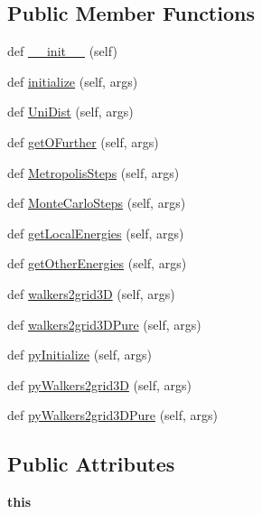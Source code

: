 \subsection*{Public Member Functions}
\begin{DoxyCompactItemize}
\item 
def \hyperlink{classMontePython__cxx_1_1Warray_a07657a81a5e76b16a8fd1be4acd4c866}{\+\_\+\+\_\+init\+\_\+\+\_\+} (self)
\item 
def \hyperlink{classMontePython__cxx_1_1Warray_a6f5d808b54b22a069fc2d5de2621a944}{initialize} (self, args)
\item 
def \hyperlink{classMontePython__cxx_1_1Warray_ab5f086c7899dfdffcfee1c7191f47302}{Uni\+Dist} (self, args)
\item 
def \hyperlink{classMontePython__cxx_1_1Warray_a70db0115b835ad74080bdd64533b9e57}{get\+O\+Further} (self, args)
\item 
def \hyperlink{classMontePython__cxx_1_1Warray_a86e6b38df98cccc4268b27c9accc7f2c}{Metropolis\+Steps} (self, args)
\item 
def \hyperlink{classMontePython__cxx_1_1Warray_acfbf002621317b560957b878bc165115}{Monte\+Carlo\+Steps} (self, args)
\item 
def \hyperlink{classMontePython__cxx_1_1Warray_a03bda23743edbe907b6bf102e75a493d}{get\+Local\+Energies} (self, args)
\item 
def \hyperlink{classMontePython__cxx_1_1Warray_acfd3f3a7af174289bd0523083b9d0afd}{get\+Other\+Energies} (self, args)
\item 
def \hyperlink{classMontePython__cxx_1_1Warray_a80ffdaa1a051f2987c18fec35d3691a7}{walkers2grid3\+D} (self, args)
\item 
def \hyperlink{classMontePython__cxx_1_1Warray_a7504593338e7e56e1a8ca381ed1f3838}{walkers2grid3\+D\+Pure} (self, args)
\item 
def \hyperlink{classMontePython__cxx_1_1Warray_a2132a4de35af5b246817997cc6973b43}{py\+Initialize} (self, args)
\item 
def \hyperlink{classMontePython__cxx_1_1Warray_afbec16e1bc0362f25c38ef6a9606c450}{py\+Walkers2grid3\+D} (self, args)
\item 
def \hyperlink{classMontePython__cxx_1_1Warray_a1d07a61e8eb0cafd2632bbd183686af3}{py\+Walkers2grid3\+D\+Pure} (self, args)
\end{DoxyCompactItemize}
\subsection*{Public Attributes}
\begin{DoxyCompactItemize}
\item 
\hypertarget{classMontePython__cxx_1_1Warray_ab47376615a0c6930a0646f14e90d9f80}{}{\bfseries this}\label{classMontePython__cxx_1_1Warray_ab47376615a0c6930a0646f14e90d9f80}

\end{DoxyCompactItemize}
